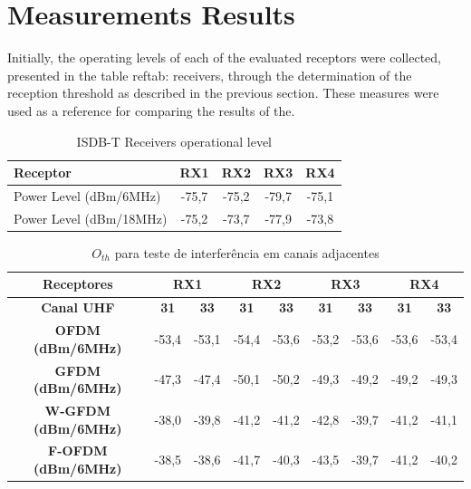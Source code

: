 \section{Measurements Results}

Initially, the operating levels of each of the evaluated receptors were collected, presented in the table ref{tab: receivers}, through the determination of the reception threshold as described in the previous section. These measures were used as a reference for comparing the results of the. 

\begin{table}[h!]
	\begin{center}
		\centering
		\caption{ISDB-T Receivers operational level}
		\label{tab:Receptores}
		\begin{tabular}{|l|c|c|c|c|}
			\hline
			\textbf{Receptor} & \textbf{RX1} & \textbf{RX2} & \textbf{RX3} & \textbf{RX4}\\
			\hline
			Power Level (dBm/6MHz)&-75,7 & -75,2 & -79,7 & -75,1\\
			\hline
			Power Level (dBm/18MHz)&-75,2 & -73,7 & -77,9 & -73,8\\
			\hline
		\end{tabular}
	\end{center}
\end{table}

\begin{table}[t!]
	\begin{center}
		\centering
		\caption{ $O_{th}$ para teste de interferência em canais adjacentes}
		\label{tab:Resultados_ADJ01}
		\begin{tabular}{|c|c|c|c|c|c|c|c|c|}
			\hline
			\textbf{Receptores}&\multicolumn{2}{c|}{\textbf{RX1}}&\multicolumn{2}{c|}{\textbf{RX2}}&\multicolumn{2}{c|}{\textbf{RX3}}&\multicolumn{2}{c|}{\textbf{RX4}}\\
			\hline
			\textbf{Canal UHF}&\textbf{31}&\textbf{33}&\textbf{31}&\textbf{33}&\textbf{31}&\textbf{33}&\textbf{31}&\textbf{33}\\
			\hline
			\textbf{OFDM (dBm/6MHz)} &-53,4&-53,1&-54,4&-53,6&-53,2&-53,6&-53,6&-53,4\\
			\hline
			\textbf{GFDM (dBm/6MHz)} &-47,3&-47,4&-50,1&-50,2&-49,3&-49,2&-49,2&-49,3\\
			\hline
			\textbf{W-GFDM (dBm/6MHz)}&-38,0&-39,8&-41,2&-41,2&-42,8&-39,7&-41,2&-41,1\\
			\hline
			\textbf{F-OFDM (dBm/6MHz)}&-38,5&-38,6&-41,7&-40,3&-43,5&-39,7&-41,2&-40,2\\
			\hline
		\end{tabular}
	\end{center}
\end{table}

